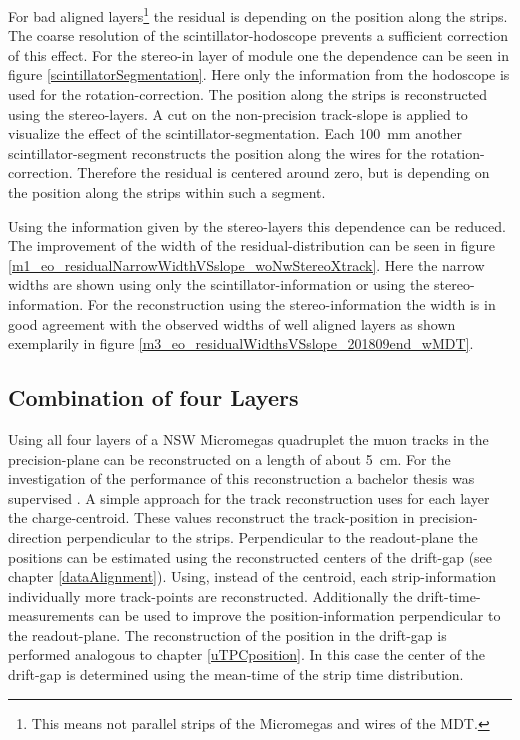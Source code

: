 \documentclass[
twoside,            %
BCOR1.4cm,          %
10pt,               %
headings=normal,    %
headsepline,        %
clearplainpage,		%
final,              %
div=14,
open=right,
bibliography=toc
]{scrreprt}
\begin{document}
For bad aligned layers\footnote{
	This means not parallel strips of the Micromegas and wires of the MDT.
} the residual is depending on the position along the strips.
The coarse resolution of the scintillator-hodoscope prevents a sufficient correction of this effect.
For the stereo-in layer of module one the dependence can be seen in figure \ref{scintillatorSegmentation}.
Here only the information from the hodoscope is used for the rotation-correction.
The position along the strips is reconstructed using the stereo-layers.
A cut on the non-precision track-slope is applied to visualize the effect of the scintillator-segmentation.
Each \SI{100}{mm} another scintillator-segment reconstructs the position along the wires for the rotation-correction.
Therefore the residual is centered around zero, but is depending on the position along the strips within such a segment.

Using the information given by the stereo-layers this dependence can be reduced.
The improvement of the width of the residual-distribution can be seen in figure \ref{m1_eo_residualNarrowWidthVSslope_woNwStereoXtrack}.
Here the narrow widths are shown using only the scintillator-information or using the stereo-information.
For the reconstruction using the stereo-information the width is in good agreement with the observed widths of well aligned layers as shown exemplarily in figure \ref{m3_eo_residualWidthsVSslope_201809end_wMDT}.

\subsection{Combination of four Layers}

Using all four layers of a NSW Micromegas quadruplet the muon tracks in the precision-plane can be reconstructed on a length of about \SI{5}{cm}.
For the investigation of the performance of this reconstruction a bachelor thesis was supervised \cite{mohlThesis}.
A simple approach for the track reconstruction uses for each layer the charge-centroid.
These values reconstruct the track-position in precision-direction perpendicular to the strips.
Perpendicular to the readout-plane the positions can be estimated using the reconstructed centers of the drift-gap (see chapter \ref{dataAlignment}).
Using, instead of the centroid, each strip-information individually more track-points are reconstructed.
Additionally the drift-time-measurements can be used to improve the position-information perpendicular to the readout-plane.
The reconstruction of the position in the drift-gap is performed analogous to chapter \ref{uTPCposition}.
In this case the center of the drift-gap is determined using the mean-time of the strip time distribution.
\end{document}
